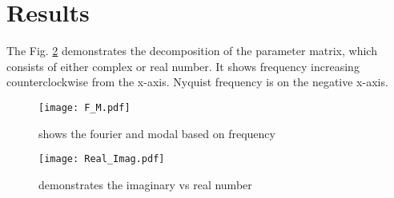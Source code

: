 \documentclass[12pt]{article}
\begin{document}
\section{Results}

The Fig. \ref{fig:Real_Imag} demonstrates the decomposition of the parameter matrix, which consists of either complex or real number. It shows frequency increasing counterclockwise from the x-axis. Nyquist frequency is on the negative x-axis.

\begin{figure}[h]
    \centering
    \texttt{[image: F\_M.pdf]}
    \caption{shows the fourier and modal based on frequency}
    \label{fig:F_M}
\end{figure}

\begin{figure}[h]
    \centering
    \texttt{[image: Real\_Imag.pdf]}
    \caption{demonstrates the imaginary vs real number}
    \label{fig:Real_Imag}
\end{figure}
\end{document}
